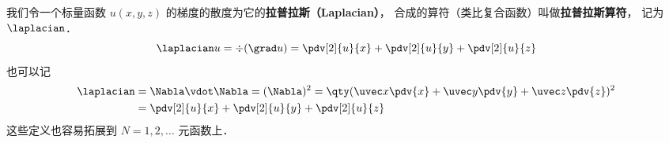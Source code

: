 

我们令一个标量函数 $u(x, y, z)$ 的梯度的散度为它的\textbf{拉普拉斯（Laplacian）}， 合成的算符（类比复合函数）叫做\textbf{拉普拉斯算符}， 记为 $\laplacian$．
\begin{equation}
\laplacian u = \div (\grad u) = \pdv[2]{u}{x} + \pdv[2]{u}{y} + \pdv[2]{u}{z}
\end{equation}
也可以记
\begin{equation}
\begin{aligned}
\laplacian &= \Nabla \vdot \Nabla = (\Nabla)^2 = \qty(\uvec x\pdv{x} + \uvec y\pdv{y} + \uvec z\pdv{z})^2\\
&= \pdv[2]{u}{x} + \pdv[2]{u}{y} + \pdv[2]{u}{z}
\end{aligned}
\end{equation}
这些定义也容易拓展到 $N = 1, 2, \dots$ 元函数上．
